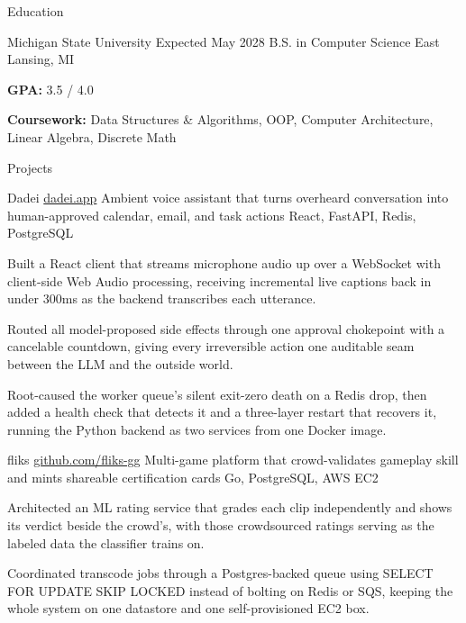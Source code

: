 \documentclass[
	11pt
]{../../../template}
\begin{document}
	\begin{rSection}{E}{ducation}
		\begin{rSectionEntry}
			{Michigan State University}
			{Expected May 2028}
			{B.S. in Computer Science}
			{}
			{East Lansing, MI}

			\item \textbf{GPA:} 3.5 / 4.0
			\item \textbf{Coursework:} Data Structures \& Algorithms, OOP, Computer Architecture, Linear Algebra, Discrete Math
		\end{rSectionEntry}
	\end{rSection}

	\begin{rSection}{P}{rojects}
		\begin{rSectionEntry}
			{Dadei}
			{\href{https://dadei.app}{dadei.app}}
			{Ambient voice assistant that turns overheard conversation into human-approved calendar, email, and task actions}
			{React, FastAPI, Redis, PostgreSQL}
			{}

			\item Built a React client that streams microphone audio up over a WebSocket with client-side Web Audio processing, receiving incremental live captions back in under 300ms as the backend transcribes each utterance.
			\item Routed all model-proposed side effects through one approval chokepoint with a cancelable countdown, giving every irreversible action one auditable seam between the LLM and the outside world.
			\item Root-caused the worker queue's silent exit-zero death on a Redis drop, then added a health check that detects it and a three-layer restart that recovers it, running the Python backend as two services from one Docker image.
		\end{rSectionEntry}

		\begin{rSectionEntry}
			{fliks}
			{\href{https://github.com/fliks-gg}{github.com/fliks-gg}}
			{Multi-game platform that crowd-validates gameplay skill and mints shareable certification cards}
			{Go, PostgreSQL, AWS EC2}
			{}

			\item Architected an ML rating service that grades each clip independently and shows its verdict beside the crowd's, with those crowdsourced ratings serving as the labeled data the classifier trains on.
			\item Coordinated transcode jobs through a Postgres-backed queue using SELECT FOR UPDATE SKIP LOCKED instead of bolting on Redis or SQS, keeping the whole system on one datastore and one self-provisioned EC2 box.
		\end{rSectionEntry}


\end{rSection}
\end{document}
